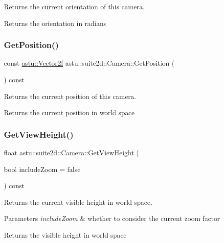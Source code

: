Returns the current orientation of this camera.

\begin{DoxyReturn}{Returns}
the orientation in radians 
\end{DoxyReturn}
\mbox{\label{classastu_1_1suite2d_1_1Camera_abe5d997e84d739243f0e943bb81472dc}} 
\subsubsection{\texorpdfstring{Get\+Position()}{GetPosition()}}
{\footnotesize\ttfamily const \hyperlink{classastu_1_1Vector2}{astu\+::\+Vector2f} astu\+::suite2d\+::\+Camera\+::\+Get\+Position (\begin{DoxyParamCaption}{ }\end{DoxyParamCaption}) const}

Returns the current position of this camera.

\begin{DoxyReturn}{Returns}
the current position in world space 
\end{DoxyReturn}
\mbox{\label{classastu_1_1suite2d_1_1Camera_a0b6bb41b626a34accbebcae80adc7a7b}} 
\subsubsection{\texorpdfstring{Get\+View\+Height()}{GetViewHeight()}}
{\footnotesize\ttfamily float astu\+::suite2d\+::\+Camera\+::\+Get\+View\+Height (\begin{DoxyParamCaption}\item[{bool}]{include\+Zoom = {\ttfamily false} }\end{DoxyParamCaption}) const}

Returns the current visible height in world space.


\begin{DoxyParams}{Parameters}
{\em include\+Zoom} & whether to consider the current zoom factor \\
\hline
\end{DoxyParams}
\begin{DoxyReturn}{Returns}
the visible height in world space 
\end{DoxyReturn}
\mbox{\label{classastu_1_1suite2d_1_1Camera_aca60878cdd99542be3f42d273104a0c4}} 

